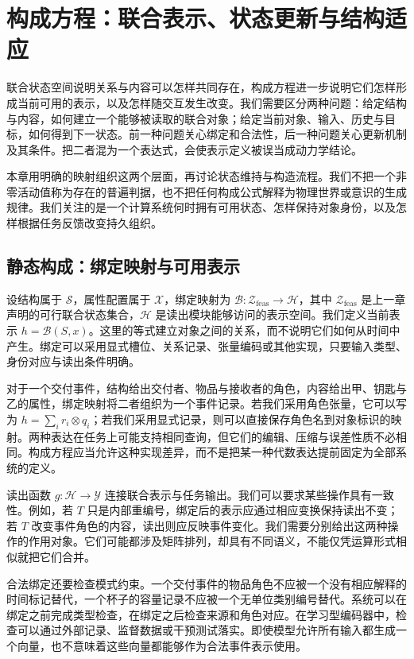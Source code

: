 \chapter{构成方程：联合表示、状态更新与结构适应}
\label{chp:constitutive_equation}

联合状态空间说明关系与内容可以怎样共同存在，构成方程进一步说明它们怎样形成当前可用的表示，以及怎样随交互发生改变。我们需要区分两种问题：给定结构与内容，如何建立一个能够被读取的联合对象；给定当前对象、输入、历史与目标，如何得到下一状态。前一种问题关心绑定和合法性，后一种问题关心更新机制及其条件。把二者混为一个表达式，会使表示定义被误当成动力学结论。

本章用明确的映射组织这两个层面，再讨论状态维持与构造流程。我们不把一个非零活动值称为存在的普遍判据，也不把任何构成公式解释为物理世界或意识的生成规律。我们关注的是一个计算系统何时拥有可用状态、怎样保持对象身份，以及怎样根据任务反馈改变持久组织。

\section{静态构成：绑定映射与可用表示}
\label{sec:static_constitution}

设结构属于 $\mathcal S$，属性配置属于 $\mathcal X$，绑定映射为 $\mathcal B:\mathcal Z_{\mathrm{feas}}\to\mathcal H$，其中 $\mathcal Z_{\mathrm{feas}}$ 是上一章声明的可行联合状态集合，$\mathcal H$ 是读出模块能够访问的表示空间。我们定义当前表示 $h=\mathcal B(S,x)$。这里的等式建立对象之间的关系，而不说明它们如何从时间中产生。绑定可以采用显式槽位、关系记录、张量编码或其他实现，只要输入类型、身份对应与读出条件明确。

对于一个交付事件，结构给出交付者、物品与接收者的角色，内容给出甲、钥匙与乙的属性，绑定映射将二者组织为一个事件记录。若我们采用角色张量，它可以写为 $h=\sum_ir_i\otimes q_i$；若我们采用显式记录，则可以直接保存角色名到对象标识的映射。两种表达在任务上可能支持相同查询，但它们的编辑、压缩与误差性质不必相同。构成方程应当允许这种实现差异，而不是把某一种代数表达提前固定为全部系统的定义。

读出函数 $g:\mathcal H\to\mathcal Y$ 连接联合表示与任务输出。我们可以要求某些操作具有一致性。例如，若 $T$ 只是内部重编号，绑定后的表示应通过相应变换保持读出不变；若 $T$ 改变事件角色的内容，读出则应反映事件变化。我们需要分别给出这两种操作的作用对象。它们可能都涉及矩阵排列，却具有不同语义，不能仅凭运算形式相似就把它们合并。

合法绑定还要检查模式约束。一个交付事件的物品角色不应被一个没有相应解释的时间标记替代，一个杯子的容量记录不应被一个无单位类别编号替代。系统可以在绑定之前完成类型检查，在绑定之后检查来源和角色对应。在学习型编码器中，检查可以通过外部记录、监督数据或干预测试落实。即使模型允许所有输入都生成一个向量，也不意味着这些向量都能够作为合法事件表示使用。

